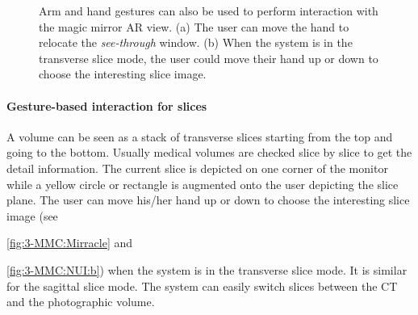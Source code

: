 {{{\begin{figure}
	\centering
	\caption[Natural User interaction]{Arm and hand gestures can also be used to perform interaction with the magic mirror AR view. (a) The user can move the hand to relocate the \textit{see-through} window. (b) When the system is in the transverse slice mode, the user could move their hand up or down to choose the interesting slice image. }
	\label{fig:3-MMC:NUI}
\end{figure}
\paragraph{Gesture-based interaction for slices} A volume can be seen as a stack of transverse slices starting from the top and going to the bottom. Usually medical volumes are checked slice by slice to get the detail information. The current slice is depicted on one corner of the monitor while a yellow circle or rectangle is augmented onto the user depicting the slice plane.
The user can move his/her hand up or down to choose the interesting slice image (see \figurename{\ref{fig:3-MMC:Mirracle} and \figurename{\ref{fig:3-MMC:NUI:b}) when the system is in the transverse slice mode. It is similar for the sagittal slice mode. The system can easily switch slices between the CT and the photographic volume.
		
}}}}}
